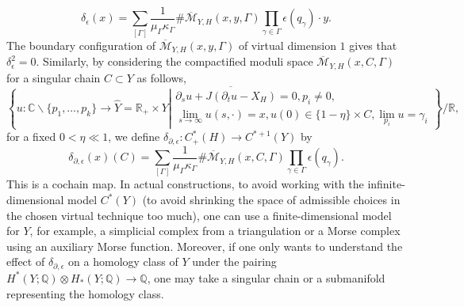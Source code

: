 \documentclass[reqno,11pt]{amsart}
\numberwithin{equation}{section}
\def\R{\mathbb{R}}
\def\C{{\mathbb C}}
\def\Q{{\mathbb Q}}
\def\cM{{\mathcal M}}
\begin{document}
\begin{equation}\label{eqn:diff}
    \delta_{\epsilon}(x) = \sum_{[\Gamma]}  \frac{1}{\mu_{\Gamma}\kappa_{\Gamma}}\#\overline{\cM}_{Y,H}(x,y,\Gamma)\prod_{\gamma\in \Gamma}\epsilon(q_{\gamma}) \cdot y.
\end{equation}
The boundary configuration of $\overline{\cM}_{Y,H}(x,y,\Gamma)$ of virtual dimension $1$ gives that $\delta_{\epsilon}^2=0$. Similarly, by considering the compactified moduli space $\overline{\cM}_{Y,H}(x,C,\Gamma)$ for a singular chain $C\subset Y$ as follows, 
$$\overline{\left\{u:\C \backslash \{p_1,\ldots,p_k\} \to \widehat{Y}=\R_+\times Y\left|
\begin{array}{c}
\partial_s u+J(\partial_t u-X_{H})=0, p_i\ne 0,\\
\displaystyle \lim_{s\to \infty} u(s,\cdot)=x, u(0)\in \{ 1-\eta\}\times C, \lim_{p_i} u= \gamma_i
\end{array}\right.\right\}/\R},$$
for a fixed $0<\eta\ll 1$, we define $\delta_{\partial,\epsilon}:C^*_+(H)\to C^{*+1}(Y)$ by 
$$\delta_{\partial,\epsilon}(x)(C) =  \sum_{[\Gamma]} \frac{1}{\mu_{\Gamma}\kappa_{\Gamma}}\#\overline{\cM}_{Y,H}(x,C,\Gamma)\prod_{\gamma\in \Gamma}\epsilon(q_{\gamma}).$$
This is a cochain map. In actual constructions, to avoid working with the infinite-dimensional model $C^*(Y)$ (to avoid shrinking the space of admissible choices in the chosen virtual technique too much), one can use a finite-dimensional model for $Y$, for example, a simplicial complex from a triangulation or a Morse complex using an auxiliary Morse function. Moreover, if one only wants to understand the effect of $\delta_{\partial,\epsilon}$ on a homology class of $Y$ under the pairing $H^*(Y;\Q)\otimes H_*(Y;\Q)\to \Q$, one may take a singular chain or a submanifold representing the homology class. 
\end{document}
